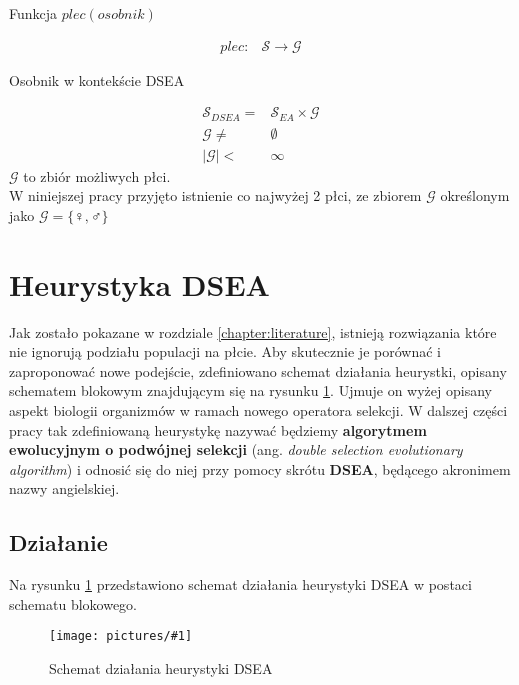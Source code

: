 \documentclass[twoside]{iisthesis}
\newcommand{\important}[1]{\mathcal{#1}}
\newcommand{\img}[1]{\texttt{[image: pictures/\#1]}}
\begin{document}
\begin{signature}
	\caption{Funkcja $plec(osobnik)$ \label{signature:genderFoo}}
	\begin{align}
	plec: & \important{S} \rightarrow \important{G}
	\end{align}
\end{signature}

\begin{signature}
	\caption{Osobnik w kontekście DSEA \label{signature:specimen_dsea}}
	\begin{align}
	\important{S}_{DSEA} = &\important{S}_{EA} \times \important{G} \\
	\important{G} \neq & \emptyset \\
	|\important{G}| < &\infty
	\end{align}	
	$\important{G}$ to zbiór możliwych płci.\\
	W niniejszej pracy przyjęto istnienie co najwyżej 2 płci, ze zbiorem $\important{G}$ określonym jako $\important{G} = \{ \female, \male \}$
\end{signature}

\section{Heurystyka DSEA} \label{section:dsea}

Jak zostało pokazane w rozdziale \ref{chapter:literature}, istnieją rozwiązania które nie ignorują podziału populacji na płcie. 
Aby skutecznie je porównać i zaproponować nowe podejście, zdefiniowano schemat działania heurystki, opisany schematem blokowym znajdującym się na rysunku \ref{figure:dsea}. Ujmuje on wyżej opisany aspekt biologii organizmów w ramach nowego operatora selekcji. 
W dalszej części pracy tak zdefiniowaną heurystykę nazywać będziemy \textbf{algorytmem ewolucyjnym o podwójnej selekcji} (ang. \emph{double selection evolutionary algorithm}) i odnosić się do niej przy pomocy skrótu \textbf{DSEA}, będącego akronimem nazwy angielskiej.

\subsection{Działanie} \label{subsection:dsea_scheme}

Na rysunku \ref{figure:dsea} przedstawiono schemat działania heurystyki DSEA w postaci schematu blokowego. 

\begin{figure}[H]
	\caption{Schemat działania heurystyki DSEA \label{figure:dsea}}
	\img{dsea.png}
\end{figure}
\end{document}
